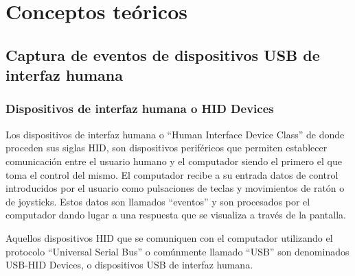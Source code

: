 \chapter{Conceptos teóricos} \label{cap2}



\newpage



\section{Captura de eventos de dispositivos USB de interfaz humana} \label{s2_1}

\subsection{Dispositivos de interfaz humana o HID Devices} \label{s2_1_1}

Los dispositivos de interfaz humana o ``Human Interface Device Class'' de donde proceden sus siglas HID, son dispositivos periféricos que permiten establecer comunicación entre el usuario humano y el computador siendo el primero el que toma el control del mismo. El computador recibe a su entrada datos de control introducidos por el usuario como pulsaciones de teclas y movimientos de ratón o de joysticks. Estos datos son llamados ``eventos'' y son procesados por el computador dando lugar a una respuesta que se visualiza a través de la pantalla. 

Aquellos dispositivos HID que se comuniquen con el computador utilizando el protocolo ``Universal Serial Bus'' o comúnmente llamado ``USB'' son denominados USB-HID Devices, o dispositivos USB de interfaz humana. 

